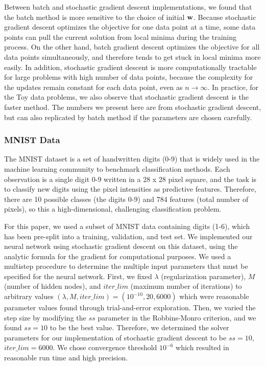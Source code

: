 Between batch and stochastic gradient descent implementations, we found that the batch method is more sensitive to the choice of initial $\boldsymbol{\mathbf{w}}$. Because stochastic gradient descent optimizes the objective for one data point at a time, some data points can pull the current solution from local minima during the training process.  On the other hand, batch gradient descent optimizes the objective for all data points simultaneously, and therefore tends to get stuck in local minima more easily. In addition, stochastic gradient descent is more computationally tractable for large problems with high number of data points, because the complexity for the updates remain constant for each data point, even as $n \rightarrow \infty$. In practice, for the Toy data problems, we also observe that stochastic gradient descent is the faster method.  The numbers we present here are from stochastic gradient descent, but can also replicated by batch method if the parameters are chosen carefully.


\subsubsection{MNIST Data}

The MNIST dataset is a set of handwritten digits (0-9) that is widely used in the machine learning community to benchmark classification methods.  Each observation is a single digit 0-9 written in a 28 x 28 pixel square, and the task is to classify new digits using the pixel intensities as predictive features.  Therefore, there are 10 possible classes (the digits 0-9) and 784 features (total number of pixels), so this a high-dimensional, challenging classification problem.  

For this paper, we used a subset of MNIST data containing digits (1-6), which has been pre-split into a training, validation, and test set.  We implemented our neural network using stochastic gradient descent on this dataset, using the analytic formula for the gradient for computational purposes. We used a multistep procedure to determine the multiple input parameters that must be specified for the neural network.  First, we fixed $\lambda$ (regularization parameter),  $M$ (number of hidden nodes), and $iter\_lim$ (maximum number of iterations) to arbitrary values $(\lambda, M, iter\_lim) = (10^{-10}, 20, 6000)$ which were reasonable parameter values found through trial-and-error exploration.  Then, we varied the step size by modifying the $ss$ parameter in the Robbins-Monro criterion, and we found $ss = 10$ to be the best value.  Therefore, we determined the solver parameters for our implementation of stochastic gradient descent to be $ss = 10$, $iter\_lim = 6000$.  We chose convergence threshold $10^{-6}$ which resulted in reasonable run time and high precision.  

